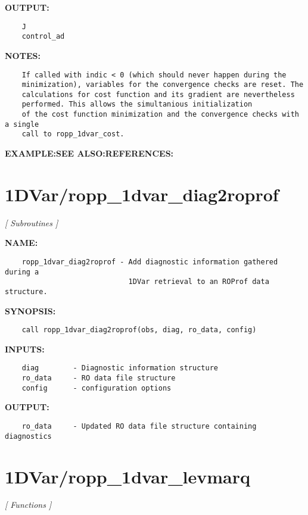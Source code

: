 \textbf{OUTPUT:}\hspace{0.08in}\begin{Verbatim}
    J 
    control_ad
\end{Verbatim}
\textbf{NOTES:}\hspace{0.08in}\begin{Verbatim}
    If called with indic < 0 (which should never happen during the 
    minimization), variables for the convergence checks are reset. The 
    calculations for cost function and its gradient are nevertheless 
    performed. This allows the simultanious initialization
    of the cost function minimization and the convergence checks with a single
    call to ropp_1dvar_cost.
\end{Verbatim}
\textbf{EXAMPLE:}\hspace{0.08in}\textbf{SEE ALSO:}\hspace{0.08in}\textbf{REFERENCES:}\hspace{0.08in}\section{1DVar/ropp\_1dvar\_diag2roprof}
\textsl{[ Subroutines ]}

\label{ch:robo1}
\label{ch:1DVar_ropp_1dvar_diag2roprof}
\textbf{NAME:}\hspace{0.08in}\begin{Verbatim}
    ropp_1dvar_diag2roprof - Add diagnostic information gathered during a
                             1DVar retrieval to an ROProf data structure.
\end{Verbatim}
\textbf{SYNOPSIS:}\hspace{0.08in}\begin{Verbatim}
    call ropp_1dvar_diag2roprof(obs, diag, ro_data, config)
\end{Verbatim}
\textbf{INPUTS:}\hspace{0.08in}\begin{Verbatim}
    diag        - Diagnostic information structure
    ro_data     - RO data file structure
    config      - configuration options
\end{Verbatim}
\textbf{OUTPUT:}\hspace{0.08in}\begin{Verbatim}
    ro_data     - Updated RO data file structure containing diagnostics
\end{Verbatim}
\section{1DVar/ropp\_1dvar\_levmarq}
\textsl{[ Functions ]}

